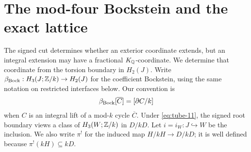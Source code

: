 \section{The mod-four Bockstein and the exact lattice}\label{sec:integral-lattice}

The signed cut determines whether an exterior coordinate extends,
but an integral extension may have a fractional \(K_{\mathbb Q}\)-coordinate.
We determine that coordinate from the torsion boundary in \(H_2(J)\).
Write
\(\beta_{\rm Bock}:H_3(J;\mathbb Z/k)\to H_2(J)\) for the coefficient Bockstein,
using the same notation on restricted interfaces below.
Our convention is
\[
 \beta_{\rm Bock}[\overline C]=[\partial C/k]
\]
when \(C\) is an integral lift of a mod-\(k\) cycle
\(\overline C\). Under \eqref{eq:tube-11},
the signed root boundary views
a class of \(H_3(W;\mathbb Z/k)\) in \(D/kD\).
Let \(i=i_W:J\hookrightarrow W\) be the inclusion. We also write
\(\pi^!\) for the induced map \(H/kH\to D/kD\);
it is well defined because \(\pi^!(kH)\subseteq kD\).


